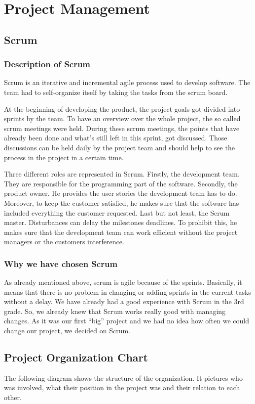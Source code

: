\chapter{Project Management}
\section{Scrum}
\subsection{Description of Scrum}
Scrum is an iterative and incremental agile process used to develop software. The team had to self-organize itself by taking the tasks from the scrum board.

At the beginning of developing the product, the project goals got divided into sprints by the team. To have an overview over the whole project, the so called scrum meetings were held. During these scrum meetings, the points that have already been done and what’s still left in this sprint, got discussed. Those discussions can be held daily by the project team and should help to see the process in the project in a certain time.

Three different roles are represented in Scrum. Firstly, the development team. They are responsible for the programming part of the software. Secondly, the product owner. He provides the user stories the development  team has to do. Moreover, to keep the customer satisfied, he makes sure that the software has included everything the customer requested. Last but not least, the Scrum master. Disturbances can delay the milestones deadlines. To prohibit this, he makes sure that the development team can work efficient without the project managers or the customers interference.
\subsection{Why we have chosen Scrum}
As already mentioned above, scrum is agile because of the sprints. Basically, it means that there is no problem in changing or adding sprints in the current tasks without a delay. We have already had a good experience with Scrum in the 3rd grade. So, we already knew that Scrum works really good with managing changes. As it was our first “big” project and we had no idea how often we could change our project, we decided on Scrum.

\section{Project Organization Chart}
The following diagram shows the structure of the organization. It pictures who was involved, what their position in the project was and their relation to each other. 

